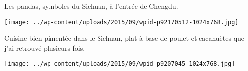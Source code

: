  Les pandas, symboles du Sichuan, à l'entrée de Chengdu. 
\begin{center} \texttt{[image: ../wp-content/uploads/2015/09/wpid-p92170512-1024x768.jpg]} \end{center}

\pagebreak
 Cuisine bien pimentée dans le Sichuan, plat à base de poulet et cacahuètes que j'ai retrouvé plusieurs fois. 
\begin{center} \texttt{[image: ../wp-content/uploads/2015/09/wpid-p9207045-1024x768.jpg]} \end{center}